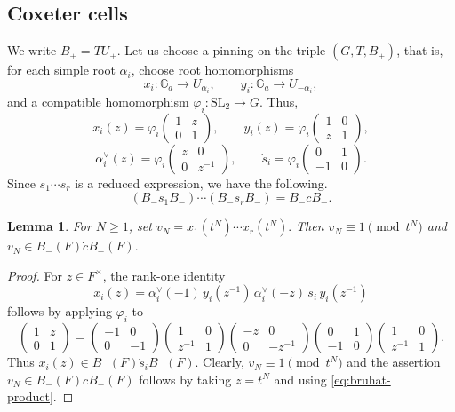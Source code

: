 \documentclass[11pt]{amsart}
\numberwithin{equation}{section}
\newtheorem{lemma}[lemma]{Lemma}
\theoremstyle{definition}
\theoremstyle{remark}
\begin{document}
\subsection{Coxeter cells}
We write $B_\pm=TU_\pm$. Let us choose a pinning on the triple $(G,T,B_{+})$, that is, for each simple root $\alpha_i$, choose root
homomorphisms
\[
  x_i:\mathbb{G}_a\longrightarrow U_{\alpha_i},\qquad
  y_i:\mathbb{G}_a\longrightarrow U_{-\alpha_i},
\]
and a compatible homomorphism $\varphi_i:\mathrm{SL}_2\to G$. Thus,
\[
  x_i(z)=\varphi_i\!\begin{pmatrix}1&z\\0&1\end{pmatrix},\qquad
  y_i(z)=\varphi_i\!\begin{pmatrix}1&0\\z&1\end{pmatrix},
\]
\[
  \alpha_i^\vee(z)=
  \varphi_i\!\begin{pmatrix}z&0\\0&z^{-1}\end{pmatrix},\qquad
  \dot s_i=\varphi_i\!\begin{pmatrix}0&1\\-1&0\end{pmatrix}.
\]
Since $s_{1}\cdots s_{r}$ is a reduced expression, we have the following.
\begin{equation}\label{eq:bruhat-product}
  (B_-\dot s_{1}B_-)\cdots(B_-\dot s_{r}B_-)
  =B_-\dot cB_-.
\end{equation}
\begin{lemma}\label{lem:coxeter-factor}
For $N\geq1$, set
$
  v_N=x_{1}(t^N)\cdots x_{r}(t^N).
$
Then $v_N\equiv1\pmod{t^N}$ and
$
  v_N\in B_-(F)\dot cB_-(F).
$
\end{lemma}
\begin{proof}
For $z\in F^\times$, the rank-one identity
\begin{equation}\label{eq:rank-one}
x_i(z)=\alpha_i^\vee(-1)\,y_i(z^{-1})\,\alpha_i^\vee(-z)\,\dot s_i\,y_i(z^{-1})
\end{equation}
follows by applying $\varphi_i$ to
\[
\begin{pmatrix}1&z\\0&1\end{pmatrix}
=
\begin{pmatrix}-1&0\\0&-1\end{pmatrix}
\begin{pmatrix}1&0\\z^{-1}&1\end{pmatrix}
\begin{pmatrix}-z&0\\0&-z^{-1}\end{pmatrix}
\begin{pmatrix}0&1\\-1&0\end{pmatrix}
\begin{pmatrix}1&0\\z^{-1}&1\end{pmatrix}.
\]
Thus $x_i(z)\in B_-(F)\dot s_iB_-(F)$. Clearly, $v_N\equiv1\pmod{t^N}$ and the assertion $v_N\in B_-(F)\dot cB_-(F)$ follows by taking $z=t^N$ and using \eqref{eq:bruhat-product}. 
\end{proof}
\end{document}
